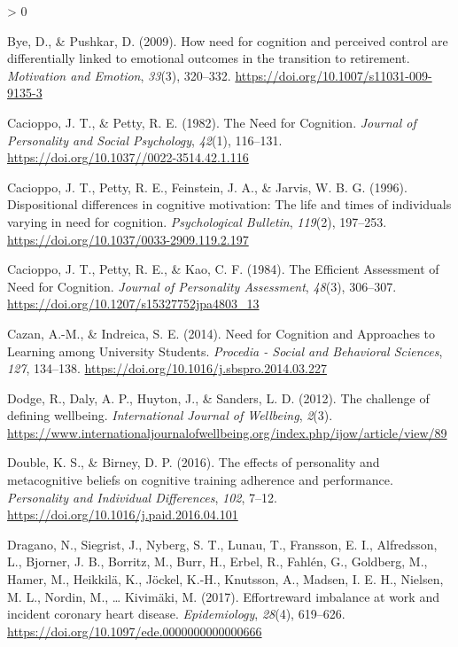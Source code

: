 \documentclass[
  english,
  man]{apa6}
\newlength{\cslhangindent}
\newenvironment{CSLReferences}[2] %
 {%
  \setlength{\parindent}{0pt}
  \ifodd #1 \everypar{\setlength{\hangindent}{\cslhangindent}}\ignorespaces\fi
  \ifnum #2 > 0
  \setlength{\parskip}{#2\baselineskip}
  \fi
 }%
 {}
\begin{document}
\begin{CSLReferences}{1}{0}
\leavevmode\hypertarget{ref-Bye2009}{}%
Bye, D., \& Pushkar, D. (2009). How need for cognition and perceived control are differentially linked to emotional outcomes in the transition to retirement. \emph{Motivation and Emotion}, \emph{33}(3), 320--332. \url{https://doi.org/10.1007/s11031-009-9135-3}

\leavevmode\hypertarget{ref-Cacioppo1982}{}%
Cacioppo, J. T., \& Petty, R. E. (1982). The {Need} for {Cognition}. \emph{Journal of Personality and Social Psychology}, \emph{42}(1), 116--131. \url{https://doi.org/10.1037//0022-3514.42.1.116}

\leavevmode\hypertarget{ref-Cacioppo1996}{}%
Cacioppo, J. T., Petty, R. E., Feinstein, J. A., \& Jarvis, W. B. G. (1996). Dispositional differences in cognitive motivation: {The} life and times of individuals varying in need for cognition. \emph{Psychological Bulletin}, \emph{119}(2), 197--253. \url{https://doi.org/10.1037/0033-2909.119.2.197}

\leavevmode\hypertarget{ref-Cacioppo1984}{}%
Cacioppo, J. T., Petty, R. E., \& Kao, C. F. (1984). The {Efficient} {Assessment} of {Need} for {Cognition}. \emph{Journal of Personality Assessment}, \emph{48}(3), 306--307. \url{https://doi.org/10.1207/s15327752jpa4803_13}

\leavevmode\hypertarget{ref-Cazan2014}{}%
Cazan, A.-M., \& Indreica, S. E. (2014). Need for {Cognition} and {Approaches} to {Learning} among {University} {Students}. \emph{Procedia - Social and Behavioral Sciences}, \emph{127}, 134--138. \url{https://doi.org/10.1016/j.sbspro.2014.03.227}

\leavevmode\hypertarget{ref-Dodge2012}{}%
Dodge, R., Daly, A. P., Huyton, J., \& Sanders, L. D. (2012). The challenge of defining wellbeing. \emph{International Journal of Wellbeing}, \emph{2}(3). \url{https://www.internationaljournalofwellbeing.org/index.php/ijow/article/view/89}

\leavevmode\hypertarget{ref-Double2016}{}%
Double, K. S., \& Birney, D. P. (2016). The effects of personality and metacognitive beliefs on cognitive training adherence and performance. \emph{Personality and Individual Differences}, \emph{102}, 7--12. \url{https://doi.org/10.1016/j.paid.2016.04.101}

\leavevmode\hypertarget{ref-Dragano2017}{}%
Dragano, N., Siegrist, J., Nyberg, S. T., Lunau, T., Fransson, E. I., Alfredsson, L., Bjorner, J. B., Borritz, M., Burr, H., Erbel, R., Fahlén, G., Goldberg, M., Hamer, M., Heikkilä, K., Jöckel, K.-H., Knutsson, A., Madsen, I. E. H., Nielsen, M. L., Nordin, M., \ldots{} Kivimäki, M. (2017). Effort{{}}reward imbalance at work and incident coronary heart disease. \emph{Epidemiology}, \emph{28}(4), 619--626. \url{https://doi.org/10.1097/ede.0000000000000666}


\end{CSLReferences}
\end{document}
